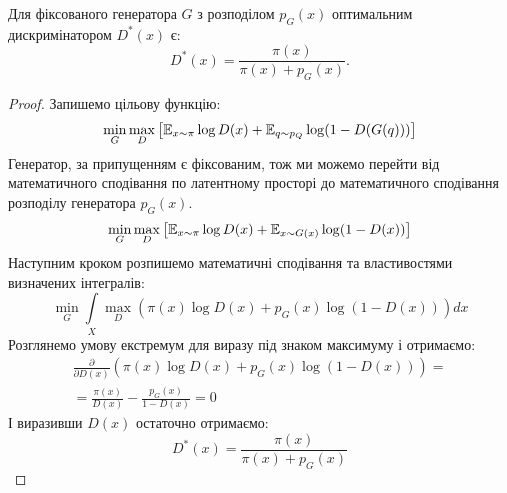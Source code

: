 \begin{theorem}
    Для фіксованого генератора $G$ з розподілом $p_G(x)$
    оптимальним дискримінатором $D^*(x)$ є:
    \begin{equation*}
        D^{*}(x) = \frac{\pi(x)}{\pi(x) + p_G(x)}.
    \end{equation*}
\end{theorem}
\begin{proof}
    Запишемо цільову функцію:
    \begin{equation*}
        \min\limits_{G}\max\limits_{D} \left[
            \operatorname{\mathbb{E}}_{x \sim \pi} \log D(x) +
            \operatorname{\mathbb{E}}_{q \sim p_{Q}} \log (1 - D(G(q))) \right]
    \end{equation*}
    Генератор, за припущенням є фіксованим, тож ми можемо перейти
    від математичного сподівання по латентному просторі до математичного сподівання
    розподілу генератора $p_G(x)$.
    \begin{equation*}
        \min\limits_{G}\max\limits_{D} \left[
            \operatorname{\mathbb{E}}_{x \sim \pi} \log D(x) +
            \operatorname{\mathbb{E}}_{x \sim G(x)} \log (1 - D(x)) \right]
    \end{equation*}
    Наступним кроком розпишемо математичні сподівання та
    властивостями визначених інтегралів:
    \begin{equation*}
        \min\limits_{G} \int\limits_X \max\limits_{D}
        \left( \pi(x) \log D(x) +
        p_G(x) \log (1 - D(x)) \right) dx
    \end{equation*}
    Розглянемо умову екстремум для виразу під
    знаком максимуму і отримаємо:
    \begin{gather*}
        \frac{\partial}{\partial D(x)}
        \left( \pi(x) \log D(x) +
        p_G(x) \log (1 - D(x)) \right) = \\
        = \frac{\pi(x)}{D(x)} - \frac{p_G(x)}{1 - D(x)} = 0
    \end{gather*}
    І виразивши $D(x)$ остаточно отримаємо:
    \begin{equation*}
        D^{*}(x) = \frac{\pi(x)}{\pi(x) + p_G(x)}
    \end{equation*}
\end{proof}

